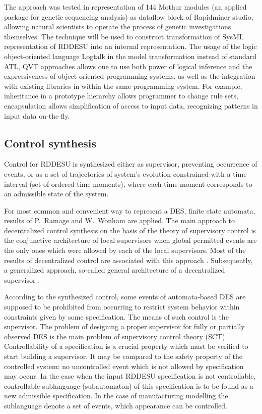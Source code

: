\documentclass[conference]{IEEEtran}
\begin{document}
The approach was tested in representation of 144 Mothur modules (an applied package for genetic sequencing analysis) as dataflow block of Rapidminer studio, allowing natural scientists to operate the process of genetic investigations themselves. The technique will be used to construct transformation of SysML representation of RDDESU into an internal representation. The usage of the logic object-oriented language Logtalk in the model transformation instead of standard ATL, QVT approaches allows one to use both power of logical inference and the expressiveness of object-oriented programming systems, as well as the integration with existing libraries in within the same programming system. For example, inheritance in a prototype hierarchy allows programmer to change rule sets, encapsulation allows simplification of access to input data, recognizing patterns in input data on-the-fly.

\subsection{Control synthesis}
\label{sec:sub-control-syn}

Control for RDDESU is synthesized either as supervisor, preventing occurrence of events, or as a set of trajectories of system’s evolution constrained with a time interval (set of ordered time moments), where each time moment corresponds to an admissible state of the system.

For most common and convenient way to represent a DES, finite state automata, results of P.~Ramage and W.~Wonham \cite{tsyoo} are applied. The main approach to decentralized control synthesis on the basis of the theory of supervisory control is the conjunctive architecture of local supervisors when global permitted events are the only ones which were allowed by each of the local supervisors. Most of the results of decentralized control are associated with this approach \cite{tsyoo}. Subsequently, a generalized approach, so-called general architecture of a decentralized supervisor \cite{tsyoo}.

According to the synthesized control, some events of automata-based DES are supposed to be prohibited from occurring to restrict system behavior within constraints given by some specification. The means of such control is the supervisor. The problem of designing a proper supervisor for fully or partially observed DES is the main problem of supervisory control theory (SCT). Controllability of a specification is a crucial property which must be verified to start building a supervisor. It may be compared to the safety property of the controlled system: no uncontrolled event which is not allowed by specification may occur. In the case when the input RDDESU specification is not controllable, controllable sublanguage (subautomaton) of this specification is to be found as a new admissible specification. In the case of manufacturing modelling the sublanguage denote a set of events, which appearance can be controlled. %
\end{document}
